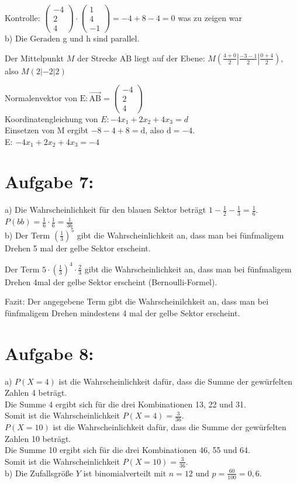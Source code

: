 \documentclass[10pt]{article}
\begin{document}
Kontrolle: $\left(\begin{array}{c}-4 \\ 2 \\ 4\end{array}\right) \cdot\left(\begin{array}{c}1 \\ 4 \\ -1\end{array}\right)=-4+8-4=0$ was zu zeigen war\\
b) Die Geraden g und h sind parallel.

Der Mittelpunkt $M$ der Strecke $\overline{\mathrm{AB}}$ liegt auf der Ebene: $M\left(\frac{4+0}{2}\left|\frac{-3-1}{2}\right| \frac{0+4}{2}\right)$, also $M(2|-2| 2)$

Normalenvektor von $\mathrm{E}: \overrightarrow{\mathrm{AB}}=\left(\begin{array}{c}-4 \\ 2 \\ 4\end{array}\right)$\\
Koordinatengleichung von $E:-4 x_{1}+2 x_{2}+4 x_{3}=d$\\
Einsetzen von M ergibt $-8-4+8=\mathrm{d}$, also $\mathrm{d}=-4$.\\
E: $-4 x_{1}+2 x_{2}+4 x_{3}=-4$

\section*{Aufgabe 7:}
a) Die Wahrscheinlichkeit für den blauen Sektor beträgt $1-\frac{1}{2}-\frac{1}{3}=\frac{1}{6}$. $P(b b)=\frac{1}{6} \cdot \frac{1}{6}=\frac{1}{36}$\\
b) Der Term $\left(\frac{1}{3}\right)^{5}$ gibt die Wahrscheinlichkeit an, dass man bei fünfmaligem Drehen 5 mal der gelbe Sektor erscheint.

Der Term $5 \cdot\left(\frac{1}{3}\right)^{4} \cdot \frac{2}{3}$ gibt die Wahrscheinlichkeit an, dass man bei fünfmaligem Drehen 4mal der gelbe Sektor erscheint (Bernoulli-Formel).

Fazit: Der angegebene Term gibt die Wahrscheinilchkeit an, dass man bei fünfmaligem Drehen mindestens 4 mal der gelbe Sektor erscheint.

\section*{Aufgabe 8:}
a) $P(X=4)$ ist die Wahrscheinlichkeit dafür, dass die Summe der gewürfelten Zahlen 4 beträgt.\\
Die Summe 4 ergibt sich für die drei Kombinationen 13, 22 und 31.\\
Somit ist die Wahrscheinlichkeit $P(X=4)=\frac{3}{36}$.\\
$P(X=10)$ ist die Wahrscheinlichkeit dafür, dass die Summe der gewürfelten Zahlen 10 beträgt.\\
Die Summe 10 ergibt sich für die drei Kombinationen 46, 55 und 64.\\
Somit ist die Wahrscheinlichkeit $P(X=10)=\frac{3}{36}$.\\
b) Die Zufallsgröße $Y$ ist binomialverteilt mit $n=12$ und $p=\frac{60}{100}=0,6$.
\end{document}
